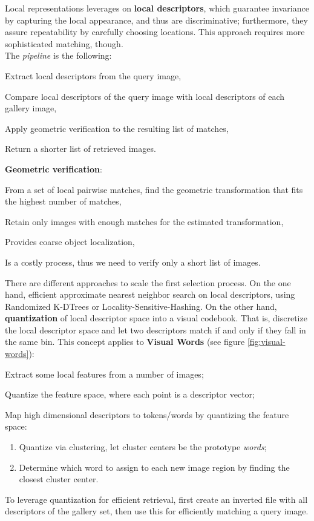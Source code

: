 Local representations leverages on \textbf{local descriptors}, which guarantee invariance by capturing the local appearance, and thus are discriminative; furthermore, they assure repeatability by carefully choosing locations. This approach requires more sophisticated matching, though.\\
The \textit{pipeline} is the following:
\begin{myenum}
    \item Extract local descriptors from the query image,
    \item Compare local descriptors of the query image with local descriptors of each gallery image,
    \item Apply geometric verification to the resulting list of matches,
    \item Return a shorter list of retrieved images.
\end{myenum}
\textbf{Geometric verification}:
\begin{myitem}
    \item From a set of local pairwise matches, find the geometric transformation that fits the highest number of matches,
    \item Retain only images with enough matches for the estimated transformation,
    \item Provides coarse object localization,
    \item Is a costly process, thus we need to verify only a short list of images.
\end{myitem}
There are different approaches to scale the first selection process. On the one hand, efficient approximate nearest neighbor search on local descriptors, using Randomized K-DTrees or Locality-Sensitive-Hashing. On the other hand, \textbf{quantization} of local descriptor space into a visual codebook. That is, discretize the local descriptor space and let two descriptors match if and only if they fall in the same bin. This concept applies to \textbf{Visual Words} (see figure \ref{fig:visual-words}):
\begin{myenum}
    \item Extract some local features from a number of images;
    \item Quantize the feature space, where each point is a descriptor vector;
    \item Map high dimensional descriptors to tokens/words by quantizing the feature space:
    \begin{enumerate}
        \item Quantize via clustering, let cluster centers be the prototype \textit{words};
        \item Determine which word to assign to each new image region by finding the closest cluster center.
    \end{enumerate}
\end{myenum}
To leverage quantization for efficient retrieval, first create an inverted file with all descriptors of the gallery set, then use this for efficiently matching a query image.

